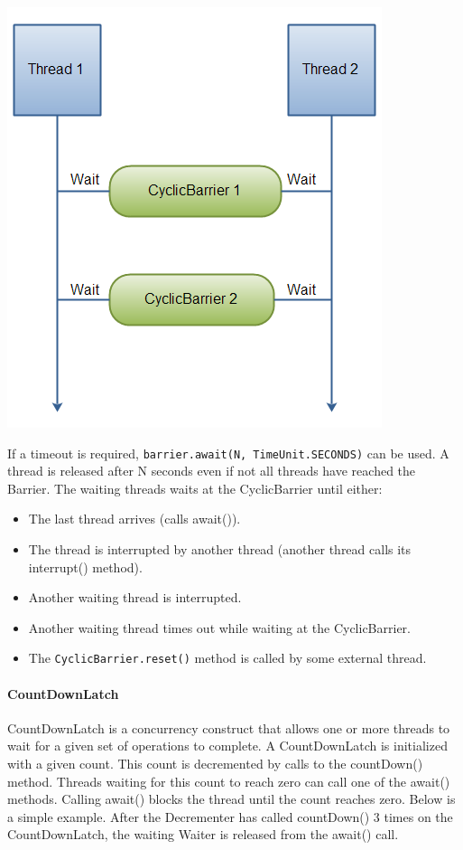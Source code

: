 \documentclass{article}
\begin{document}
\begin{center}
\includegraphics[scale=0.5]{cyclic-barrier.png}
\end{center}

If a timeout is required, \lstinline{barrier.await(N, TimeUnit.SECONDS)} can be used. A thread is released after N seconds even if not all threads have reached the Barrier. The waiting threads waits at the CyclicBarrier until either:
\begin{itemize}
    \item The last thread arrives (calls await()).
    \item The thread is interrupted by another thread (another thread calls its interrupt() method).
    \item Another waiting thread is interrupted.
    \item Another waiting thread times out while waiting at the CyclicBarrier.
    \item The \lstinline{CyclicBarrier.reset()} method is called by some external thread.
\end{itemize}

\paragraph{CountDownLatch} CountDownLatch is a concurrency construct that allows one or more threads to wait for a given set of operations to complete. A CountDownLatch is initialized with a given count. This count is decremented by calls to the countDown() method. Threads waiting for this count to reach zero can call one of the await() methods. Calling await() blocks the thread until the count reaches zero. Below is a simple example. After the Decrementer has called countDown() 3 times on the CountDownLatch, the waiting Waiter is released from the await() call.
\end{document}

